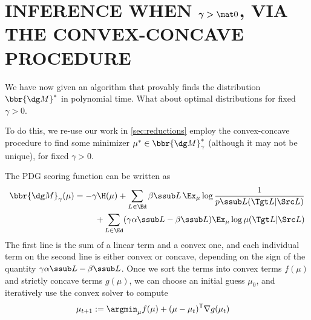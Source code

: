

\section{INFERENCE WHEN
    \texorpdfstring{$\boldsymbol\gamma \boldsymbol> \mat 0$}{gamma > 0},
    VIA THE CONVEX-CONCAVE PROCEDURE }

We have now given an algorithm that provably finds the distribution $\bbr{\dg M}^*$ in polynomial time. 
What about optimal distributions for fixed $\gamma > 0$.



To do this, we re-use our work in \cref{sec:reductions} employ the convex-concave procedure 
\parencite{yuille2003concave} to find some minimizer $\mu^* \in \bbr{\dg M}^*_\gamma$ (although it may not be unique), for fixed $\gamma > 0$.

The PDG scoring function can be written as \parencite[Proposition 4.6]{pdg-aaai}
\begin{align*}
    \bbr{\dg M}_\gamma(\mu) = 
        -\gamma\H(\mu) + 
            \sum_{L \in \Ed}
                \beta\ssub L\, \Ex_\mu 
                    \log \frac1{p\ssub L(\Tgt L | \Src L)}
                \\
            + \sum_{L \in \Ed}
            (\gamma \alpha \ssub L - \beta\ssub L)
                \Ex_\mu \log \mu(\Tgt L | \Src L)
\end{align*}
The first line is the sum of a linear term and a convex one,
and each individual term on the second line is either convex or concave, depending on the sign of the quantity $\gamma \alpha\ssub L - \beta\ssub L$. 
Once we sort the terms into convex terms $f(\mu)$ and strictly concave terms $g(\mu)$, we can choose an initial guess $\mu_0$, and iteratively use the convex solver to compute
%
\begin{align*}
    \mu_{t+1} &:= \argmin_{\mu} f(\mu) + (\mu - \mu_{t})^{\sf T}
        \nabla g(\mu_t)
\end{align*}

